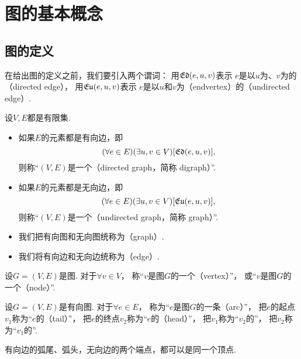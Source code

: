 \section{图的基本概念}
\subsection{图的定义}
在给出图的定义之前，我们要引入两个谓词：
用\(\mathfrak{Ed}(e,u,v)\)表示
\(e\)是以\(u\)为、\(v\)为的（directed edge），
用\(\mathfrak{Eu}(e,u,v)\)表示
\(e\)是以\(u\)和\(v\)为（endvertex）的（undirected edge）.

\begin{definition}
设\(V,E\)都是有限集.
\begin{itemize}
	\item 如果\(E\)的元素都是有向边，即\[
		(\forall e \in E)
		(\exists u,v \in V)
		[\mathfrak{Ed}(e,u,v)],
	\]
	则称“\((V,E)\)是一个（directed graph，简称 digraph）”.

	\item 如果\(E\)的元素都是无向边，即\[
		(\forall e \in E)
		(\exists u,v \in V)
		[\mathfrak{Eu}(e,u,v)],
	\]
	则称“\((V,E)\)是一个（undirected graph，简称 graph）”.

	\item 我们把有向图和无向图统称为（graph）.

	\item 我们将有向边和无向边统称为（edge）.
\end{itemize}
\end{definition}

\begin{definition}
设\(G = (V,E)\)是图.
对于\(\forall v \in V\)，
称“\(v\)是图\(G\)的一个（vertex）”，
或“\(v\)是图\(G\)的一个（node）”.
\end{definition}

\begin{definition}
设\(G = (V,E)\)是有向图.
对于\(\forall e \in E\)，
称为“\(e\)是图\(G\)的一条（arc）”，
把\(e\)的起点\(v_1\)称为“\(e\)的（tail）”，
把\(e\)的终点\(v_2\)称为“\(e\)的（head）”，
把\(v_1\)称为“\(v_2\)的”，
把\(v_2\)称为“\(v_1\)的”.
\end{definition}
\begin{remark}
有向边的弧尾、弧头，无向边的两个端点，都可以是同一个顶点.
\end{remark}

